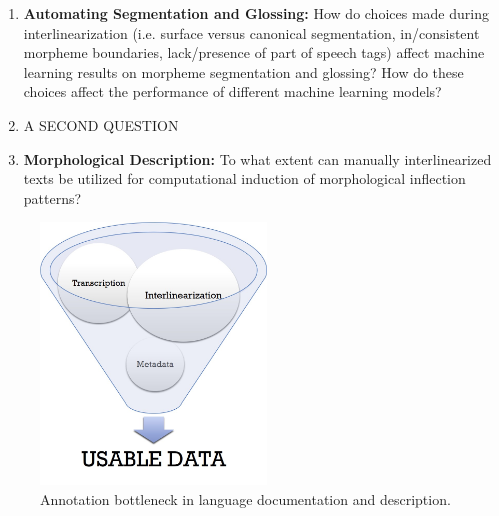\begin{enumerate}
\item{} \textbf{Automating Segmentation and Glossing:} How do choices made during interlinearization (i.e. surface versus canonical segmentation, in/consistent morpheme boundaries, lack/presence of part of speech tags) affect machine learning results on morpheme segmentation and glossing? How do these choices affect the performance of different machine learning models?

\item A SECOND QUESTION


\item{} \textbf{Morphological Description:} To what extent can manually interlinearized texts be utilized for computational induction of morphological inflection patterns? 
\end{enumerate}


\begin{figure}[h!]
    \centering
    \includegraphics[width=6cm]{figs/AnnotationFunnel.jpg}
    \caption[Annotation Bottleneck]{Annotation bottleneck in language documentation and description.}
    \label{fig:bottleneck}
\end{figure}

